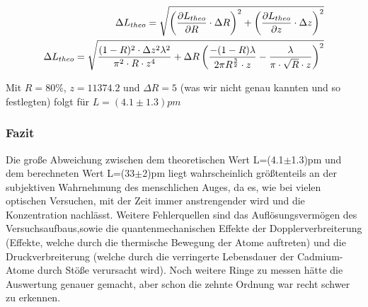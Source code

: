 \begin{equation}\notag
\begin{split}
\Delta L_{theo}=\sqrt{\left(\frac{\partial L_{theo}}{\partial R}\cdot \Delta R\right)^2+\left(\frac{\partial L_{theo}}{\partial z}\cdot \Delta z\right)^2}\\
\Delta L_{theo}=\sqrt{\frac{(1-R)^2\cdot\Delta z^2\lambda^2}{\pi^2\cdot R\cdot z^4}+\Delta R\left(\frac{-(1-R)\lambda}{2\pi R^{\frac{3}{2}}\cdot z}-\frac{\lambda}{\pi \cdot \sqrt{R}\cdot z}\right)^2}
\end{split}
\end{equation}

Mit $R=80\%$, $z=11374.2$ und $\Delta R=5$ (was wir nicht genau kannten und so festlegten) folgt für $L=(4.1\pm 1.3)pm$

\subsubsection{Fazit}
Die große Abweichung zwischen dem theoretischen Wert L=(4.1$\pm$1.3)pm und dem berechneten Wert L=(33$\pm$2)pm liegt wahrscheinlich größtenteils an der subjektiven Wahrnehmung des menschlichen Auges, da es, wie bei vielen optischen Versuchen, mit der Zeit immer anstrengender wird und die Konzentration nachlässt. Weitere Fehlerquellen sind das Auflösungsvermögen des Versuchsaufbaus,sowie die quantenmechanischen Effekte der Dopplerverbreiterung (Effekte, welche durch die thermische Bewegung der Atome auftreten) und die Druckverbreiterung (welche durch die verringerte Lebensdauer der Cadmium-Atome durch Stöße verursacht wird).
Noch weitere Ringe zu messen hätte die Auswertung genauer gemacht, aber schon die zehnte Ordnung war recht schwer zu erkennen.
